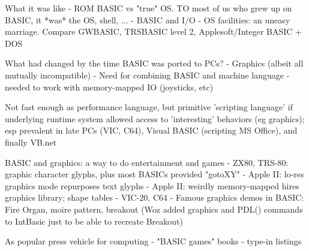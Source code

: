 What it was like
  - ROM BASIC vs "true" OS.  TO most of us who grew up on BASIC, it
  *was* the OS, shell, ...
  - BASIC and I/O - OS facilities: an uneasy marriage.  Compare GWBASIC,
  TRSBASIC level 2, Applesoft/Integer BASIC + DOS

What had changed by the time BASIC was ported to PCs?
-  Graphics (albeit all mutually incompatible)
-  Need for combining BASIC and machine language
-  needed to work with memory-mapped IO (joysticks, etc)

Not fast enough as performance language, but primitive 'scripting
language' if underlying runtime system allowed access to 'interesting'
behaviors (eg graphics); esp prevalent in late PCs (VIC, C64), Visual
BASIC (scripting MS Office), and finally VB.net


BASIC and graphics: a way to do entertainment and games
  - ZX80, TRS-80: graphic character glyphs, plus most BASICs provided "gotoXY"
  - Apple II: lo-res graphics mode repurposes text glyphs
  - Apple II: weirdly memory-mapped hires graphics library; shape tables
  - VIC-20, C64
  - Famous graphics demos in BASIC: Fire Organ, moire pattern, breakout
  (Woz added graphics and PDL() commands to IntBasic just to be able to
  recreate Breakout)

As popular press vehicle for computing
  - "BASIC games" books
  - type-in listings

